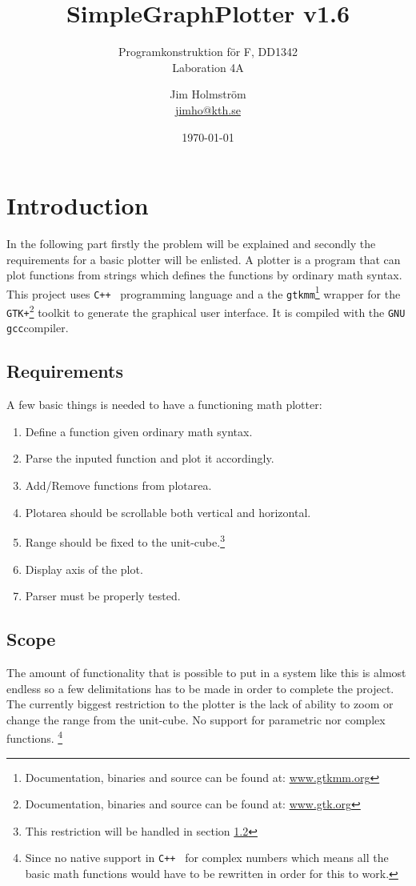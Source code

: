 \documentclass[a4paper,11pt]{kth-mag}
\title{SimpleGraphPlotter v1.6}
\subtitle{Programkonstruktion f\"{o}r F, DD1342\\ Laboration 4A}
\author{Jim Holmstr\"{o}m\\\href{mailto:jimho@kth.se}{jimho@kth.se}}
\date{\today}
\newcommand{\Cpp}{\texttt{C++}}
\newcommand{\Gcc}{\texttt{gcc}}
\newcommand{\Gtkmm}{\texttt{gtkmm}}
\newcommand{\Gtk}{\texttt{GTK+}}
\begin{document}
\frontmatter
\pagestyle{empty}
\removepagenumbers
\maketitle
{}
\tableofcontents*
\mainmatter
\pagestyle{newchap}

\chapter{Introduction}
In the following part firstly the problem will be explained and secondly the requirements for a basic plotter will be enlisted.
A plotter is a program that can plot functions from strings which defines the functions by ordinary math syntax. 
This project uses \Cpp~ programming language and a the 
\Gtkmm\footnote{Documentation, binaries and source can be found at: \href{http://www.gtkmm.org}{www.gtkmm.org}} wrapper for the 
\Gtk\footnote{Documentation, binaries and source can be found at: \href{http://www.gtk.org}{www.gtk.org}} toolkit to generate the graphical user interface. 
It is compiled with the \texttt{GNU} \Gcc compiler.

\section{Requirements}
A few basic things is needed to have a functioning math plotter:
\begin{enumerate}
\item Define a function given ordinary math syntax.
\item Parse the inputed function and plot it accordingly.
\item Add/Remove functions from plotarea.
\item Plotarea should be scrollable both vertical and horizontal.
\item Range should be fixed to the unit-cube.\footnote{This restriction will be handled in section \ref{sec:scope}}
\item Display axis of the plot.
\item Parser must be properly tested.
\end{enumerate}

\section{Scope}
\label{sec:scope}
The amount of functionality that is possible to put in a system like this is almost endless so a few delimitations has to be made in order to complete the project.
The currently biggest restriction to the plotter is the lack of ability to zoom or change the range from the unit-cube.
No support for parametric nor complex functions.
\footnote{Since no native support in \Cpp~ for complex numbers which means all the basic math functions would have to be rewritten in order for this to work.}
\end{document}
